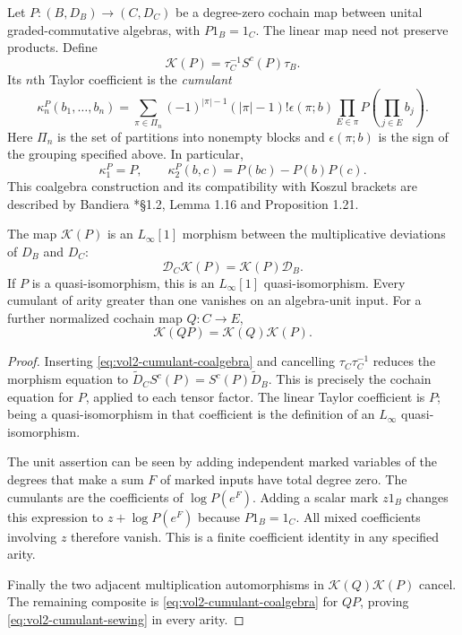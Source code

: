 Let $P:(B,D_B)\to(C,D_C)$ be a degree-zero cochain map between
unital graded-commutative algebras, with $P1_B=1_C$.
The linear map need not preserve products. Define
\begin{equation}\label{eq:vol2-cumulant-coalgebra}
 \mathscr K(P)=\tau_C^{-1}S^c(P)\tau_B.
\end{equation}
Its $n$th Taylor coefficient is the \emph{cumulant}
\begin{equation}\label{eq:vol2-state-cumulant}
 \kappa_n^P(b_1,\ldots,b_n)=
 \sum_{\pi\in\Pi_n}(-1)^{|\pi|-1}(|\pi|-1)!
 \epsilon(\pi;b)
 \prod_{E\in\pi}P\!\left(\prod_{j\in E}b_j\right).
\end{equation}
Here $\Pi_n$ is the set of partitions into nonempty blocks and
$\epsilon(\pi;b)$ is the sign of the grouping specified above.
In particular,
\[
 \kappa_1^P=P,\qquad
 \kappa_2^P(b,c)=P(bc)-P(b)P(c).
\]
This coalgebra construction and its compatibility with
Koszul brackets are described by Bandiera
\cite{Bandiera2020}*{\S1.2, Lemma 1.16 and Proposition 1.21}.

\begin{theorem}\label{thm:vol2-cumulant-comparison}
The map $\mathscr K(P)$ is an $L_\infty[1]$ morphism between
the multiplicative deviations of $D_B$ and $D_C$:
\[
 \mathscr D_C\mathscr K(P)=\mathscr K(P)\mathscr D_B.
\]
If $P$ is a quasi-isomorphism, this is an $L_\infty[1]$
quasi-isomorphism. Every cumulant of arity greater than one
vanishes on an algebra-unit input. For a further normalized
cochain map $Q:C\to E$,
\begin{equation}\label{eq:vol2-cumulant-sewing}
 \mathscr K(QP)=\mathscr K(Q)\mathscr K(P).
\end{equation}
\end{theorem}
\begin{proof}
Inserting \eqref{eq:vol2-cumulant-coalgebra} and cancelling
$\tau_C\tau_C^{-1}$ reduces the morphism equation to
$\widetilde D_CS^c(P)=S^c(P)\widetilde D_B$.
This is precisely the cochain equation for $P$, applied to
each tensor factor. The linear Taylor coefficient is $P$;
being a quasi-isomorphism in that coefficient is the definition
of an $L_\infty$ quasi-isomorphism.

The unit assertion can be seen by adding independent marked
variables of the degrees that make a sum $F$ of marked inputs
have total degree zero. The cumulants are the coefficients of
$\log P(e^F)$. Adding a scalar mark $z1_B$ changes this expression
to $z+\log P(e^F)$ because $P1_B=1_C$.
All mixed coefficients involving $z$ therefore vanish.
This is a finite coefficient identity in any specified arity.

Finally the two adjacent multiplication automorphisms in
$\mathscr K(Q)\mathscr K(P)$ cancel. The remaining composite
is \eqref{eq:vol2-cumulant-coalgebra} for $QP$, proving
\eqref{eq:vol2-cumulant-sewing} in every arity.
\end{proof}

